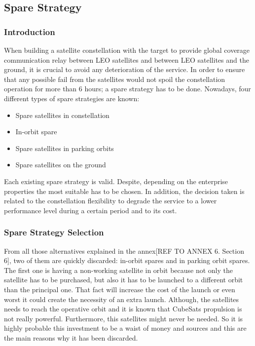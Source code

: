 \subsection{Spare Strategy}

\subsubsection{Introduction}
When building a satellite constellation with the target to provide global coverage communication relay between LEO satellites and between LEO satellites and the ground, it is crucial to avoid any deterioration of the service. In order to ensure that any possible fail from the satellites would not spoil the constellation operation for more than 6 hours; a spare strategy has to be done. Nowadays, four different types of spare strategies are known:

\begin{itemize} 
\item {Spare satellites in constellation}
\item {In-orbit spare} 
\item {Spare satellites in parking orbits} 
\item {Spare satellites on the ground} 
\end{itemize}

Each existing spare strategy is valid. Despite, depending on the enterprise properties the most suitable has to be chosen. In addition, the decision taken is related to the constellation flexibility to degrade the service to a lower performance level during a certain period and to its cost. 

\subsubsection{Spare Strategy Selection}
From all those alternatives explained in the annex[{REF TO ANNEX 6. Section 6}], two of them  are quickly discarded: in-orbit spares and in parking orbit spares. The first one is having a non-working satellite in orbit because not only the satellite has to be purchased, but also it has to be launched to a different orbit than the principal one. That fact will increase the cost of the launch or even worst it could create the necessity of an extra launch. Although, the satellites needs to reach the operative orbit and it is known that CubeSats propulsion is not really powerful. Furthermore, this satellites might never be needed. So it is highly probable this investment to be a waist of money and sources and this are the main reasons why it has been discarded.

